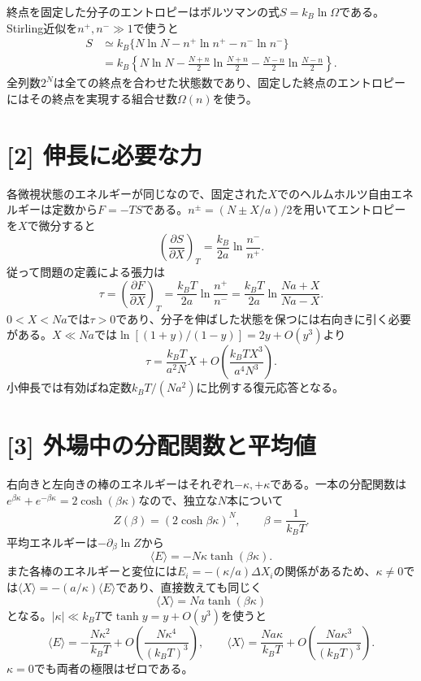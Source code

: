 \documentclass[11pt,a4paper]{article}
\begin{document}
終点を固定した分子のエントロピーはボルツマンの式$S=k_B\ln\Omega$である。Stirling近似を$n^+,n^-\gg1$で使うと
\begin{align}
 S&\simeq k_B\{N\ln N-n^+\ln n^+-n^-\ln n^-\}\\
 &=k_B\left\{N\ln N-\frac{N+n}{2}\ln\frac{N+n}{2}
                      -\frac{N-n}{2}\ln\frac{N-n}{2}\right\}.
\end{align}
全列数$2^N$は全ての終点を合わせた状態数であり、固定した終点のエントロピーにはその終点を実現する組合せ数$\Omega(n)$を使う。

\section*{[2] 伸長に必要な力}
各微視状態のエネルギーが同じなので、固定された$X$でのヘルムホルツ自由エネルギーは定数から$F=-TS$である。$n^\pm=(N\pm X/a)/2$を用いてエントロピーを$X$で微分すると
\begin{equation}
 \left(\frac{\partial S}{\partial X}\right)_T
 =\frac{k_B}{2a}\ln\frac{n^-}{n^+}.
\end{equation}
従って問題の定義による張力は
\begin{equation}
 \boxed{\tau=\left(\frac{\partial F}{\partial X}\right)_T
 =\frac{k_BT}{2a}\ln\frac{n^+}{n^-}
 =\frac{k_BT}{2a}\ln\frac{Na+X}{Na-X}}.
\end{equation}
$0<X<Na$では$\tau>0$であり、分子を伸ばした状態を保つには右向きに引く必要がある。$X\ll Na$では$\ln[(1+y)/(1-y)]=2y+O(y^3)$より
\begin{equation}
 \boxed{\tau=\frac{k_BT}{a^2N}X+O\!\left(\frac{k_BT X^3}{a^4N^3}\right)}.
\end{equation}
小伸長では有効ばね定数$k_BT/(Na^2)$に比例する復元応答となる。

\section*{[3] 外場中の分配関数と平均値}
右向きと左向きの棒のエネルギーはそれぞれ$-\kappa,+\kappa$である。一本の分配関数は$e^{\beta\kappa}+e^{-\beta\kappa}=2\cosh(\beta\kappa)$なので、独立な$N$本について
\begin{equation}
 Z(\beta)=(2\cosh\beta\kappa)^N,\qquad \beta=\frac1{k_BT}.
\end{equation}
平均エネルギーは$-\partial_\beta\ln Z$から
\begin{equation}
 \langle E\rangle=-N\kappa\tanh(\beta\kappa).
\end{equation}
また各棒のエネルギーと変位には$E_i=-(\kappa/a)\Delta X_i$の関係があるため、$\kappa\ne0$では$\langle X\rangle=-(a/\kappa)\langle E\rangle$であり、直接数えても同じく
\begin{equation}
 \langle X\rangle=Na\tanh(\beta\kappa)
\end{equation}
となる。$|\kappa|\ll k_BT$で$\tanh y=y+O(y^3)$を使うと
\begin{equation}
 \langle E\rangle=-\frac{N\kappa^2}{k_BT}
 +O\!\left(\frac{N\kappa^4}{(k_BT)^3}\right),\qquad
 \langle X\rangle=\frac{Na\kappa}{k_BT}
 +O\!\left(\frac{Na\kappa^3}{(k_BT)^3}\right).
\end{equation}
$\kappa=0$でも両者の極限はゼロである。
\end{document}
